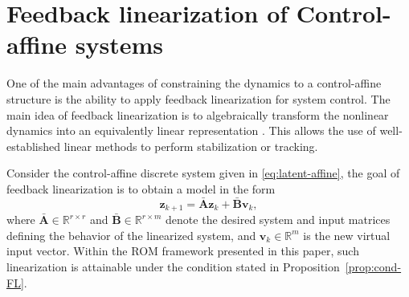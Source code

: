 \documentclass{article}
\newtheorem{proposition}{Proposition}
\begin{document}
\section{Feedback linearization of Control-affine systems}
\label{sec:FL}
One of the main advantages of constraining the dynamics to a control-affine structure is the ability to apply feedback linearization for system control.
The main idea of feedback linearization is to algebraically transform the nonlinear dynamics into an equivalently linear representation \citep{isidori1995nonlinear}.
This allows the use of well-established linear methods to perform stabilization or tracking.

Consider the control-affine discrete system given in \eqref{eq:latent-affine}, the goal of feedback linearization is to obtain a model in the form 
\begin{equation}
    \label{eq:feedback-linear-goal}
    \mathbf{z}_{k+1} = \bar{\mathbf{A}}\mathbf{z}_{k} + \bar{\mathbf{B}}\mathbf{v}_k,
\end{equation}
where $\bar{\mathbf{A}} \in \mathbb{R}^{r \times r}$ and $\bar{\mathbf{B}} \in \mathbb{R}^{r \times m}$ denote the desired system and input matrices defining the behavior of the linearized system, and $\mathbf{v}_k\in \mathbb{R}^m$ is the new virtual input vector.
Within the ROM framework presented in this paper, such linearization is attainable under the condition stated in Proposition~\ref{prop:cond-FL}.

\end{document}
